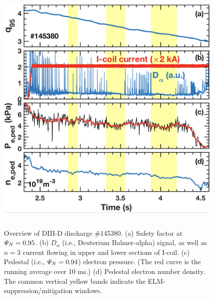 \documentclass[12pt,prb,aps]{revtex4-1}
\begin{document}
\begin{figure}
\includegraphics[height=5in]{fig1.pdf}
\caption{Overview of DIII-D discharge \#145380.
(a) Safety factor at  ${\mit\Psi}_N=0.95$. 
(b) $D_\alpha$ (i.e., Deuterium Balmer-alpha) signal, as well as $n=3$ current flowing in upper and lower sections of I-coil. 
(c) Pedestal (i.e., ${\mit\Psi}_N=0.94$)
electron pressure. (The red curve is the running average over 10 ms.) (d) Pedestal electron number density. The common vertical yellow bands indicate the ELM-suppression/mitigation windows.}\label{fig1}
\end{figure}
\end{document}
